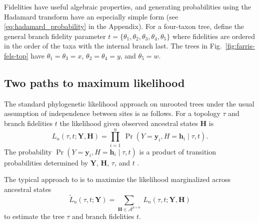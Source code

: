 \documentclass{article}
\newcommand{\alphabet}{\mathcal{A}}
\newcommand{\fullAlignment}{\mathbf{Y}}
\newcommand{\alignmentColumn}{\mathbf{y}}
\newcommand{\alignmentColumnRV}{Y}
\newcommand{\fullAncestralStates}{\mathbf{H}}
\newcommand{\ancestralStateColumn}{\mathbf{h}}
\newcommand{\ancestralStateColumnRV}{H}
\newcommand{\nCols}{n}
\newcommand{\nAncestralStateRows}{p}
\begin{document}
Fidelities have useful algebraic properties, and generating probabilities using the Hadamard transform have an especially simple form (see \eqref{eq:hadamard_probability} in the Appendix).
For a four-taxon tree, define the general branch fidelity parameter $t=\{\theta_1,\theta_2,\theta_3,\theta_4,\theta_5\}$ where fidelities are ordered in the order of the taxa with the internal branch last.
The trees in Fig.~\ref{fig:farris-fels-top} have $\theta_1=\theta_3=x$, $\theta_2=\theta_4=y$, and $\theta_5=w$.

\subsection*{Two paths to maximum likelihood}

The standard phylogenetic likelihood approach on unrooted trees under the usual assumption of independence between sites is as follows.
For a topology $\tau$ and branch fidelities $t$ the likelihood given observed ancestral states $\fullAncestralStates$ is
\begin{equation}
\label{eq:full_likelihood}
L_\nCols(\tau, t; \fullAlignment,\fullAncestralStates) = \prod_{i=1}^{\nCols} \ \Pr(\alignmentColumnRV=\alignmentColumn_i, \ancestralStateColumnRV=\ancestralStateColumn_i \mid \tau, t).
\end{equation}
The probability $\Pr(\alignmentColumnRV=\alignmentColumn_i, \ancestralStateColumnRV=\ancestralStateColumn_i \mid \tau, t)$ is a product of transition probabilities determined by $\fullAlignment$, $\fullAncestralStates$, $\tau$, and $t$ \cite{Felsenstein2004}.

The typical approach to is to maximize the likelihood marginalized across ancestral states
\begin{equation}
\label{eq:marginal_likelihood}
\tilde{L}_\nCols(\tau, t; \fullAlignment) = \sum_{\fullAncestralStates\in\alphabet^{\nAncestralStateRows\times\nCols}} \ L_\nCols(\tau, t; \fullAlignment, \fullAncestralStates)
\end{equation}
to estimate the tree $\tau$ and branch fidelities $t$.
\end{document}
